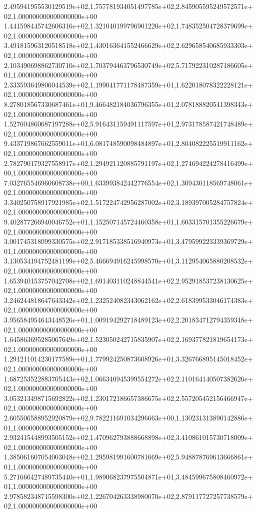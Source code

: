 2.495941955530129519e+02,1.757781934051497785e+02,2.845905595249572571e+02,1.000000000000000000e+00
1.441598445742606316e+02,1.321040199796901220e+02,1.748352504728379699e+02,1.000000000000000000e+00
3.491815963120518518e+02,1.430163641552466629e+02,2.629658540685933303e+02,1.000000000000000000e+00
2.103490698862730710e+02,1.703794463796530749e+02,5.717922310287186605e+01,1.000000000000000000e+00
2.333593649806044539e+02,1.199041771178487359e+01,1.622018078322228121e+02,1.000000000000000000e+00
8.278018567330687461e+01,9.466482184036796355e+01,2.078188820541398343e+02,1.000000000000000000e+00
1.527604860687197288e+02,5.916431159491117597e+01,2.973178587421748489e+02,1.000000000000000000e+00
9.433719867662559011e+01,6.081748590098484897e+01,2.804082225519911162e+02,1.000000000000000000e+00
2.782790179327558917e+02,1.294921120885791197e+02,1.274694224278416499e+00,1.000000000000000000e+00
7.032765546960608738e+00,1.633993842442776554e+02,1.309430118569748061e+02,1.000000000000000000e+00
3.340250758917921985e+02,1.517224742956287002e+02,3.189397005284757824e+02,1.000000000000000000e+00
9.402877266940046752e+01,1.152507145724460358e+01,1.603315701355226679e+02,1.000000000000000000e+00
3.001745318099330575e+02,2.917185338516940973e+01,3.479599223339369729e+01,1.000000000000000000e+00
3.130534194752481199e+02,5.466694916245998570e+01,3.112954065880208532e+02,1.000000000000000000e+00
1.653940153757042708e+02,1.691403110248844541e+02,2.952918537238130625e+02,1.000000000000000000e+00
3.246244818647643342e+02,1.232524082343062162e+02,2.618399533046174383e+02,1.000000000000000000e+00
3.956584954643448526e+01,1.009194292718489123e+02,2.201834712794359348e+02,1.000000000000000000e+00
1.645863695285067649e+02,1.523050242715835907e+02,2.169377821819654173e+02,1.000000000000000000e+00
1.291211014230177589e+01,1.779924250873608926e+01,3.326766895145018452e+02,1.000000000000000000e+00
1.687253522883705443e+02,1.066340945399554272e+02,2.110164140507382626e+02,1.000000000000000000e+00
3.053213498715692822e+02,1.230172186657386675e+02,2.557205452156466947e+02,1.000000000000000000e+00
2.605506588952920879e+02,9.782211691034296663e+00,1.130231313890142886e+01,1.000000000000000000e+00
2.932415448993505152e+02,1.470962793888668898e+02,3.410861015730718009e+02,1.000000000000000000e+00
1.385061607054003048e+02,1.295981991600781669e+02,5.948878769613666861e+01,1.000000000000000000e+00
5.271666427489735440e+01,1.989068237975504871e+01,3.484599675808460972e+01,1.000000000000000000e+00
2.978582348715598300e+02,1.226704263338980070e+02,2.879117727257738579e+02,1.000000000000000000e+00
